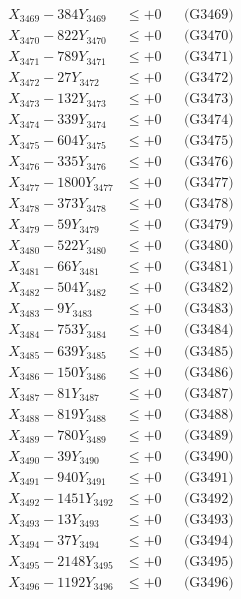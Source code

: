 \documentclass[a4paper,10pt]{article}
\begin{document}
{\begin{align}
X_{3469} - 384Y_{3469} &\leq +0 && \text{(G3469)} \\
X_{3470} - 822Y_{3470} &\leq +0 && \text{(G3470)} \\
\allowbreak
X_{3471} - 789Y_{3471} &\leq +0 && \text{(G3471)} \\
X_{3472} - 27Y_{3472} &\leq +0 && \text{(G3472)} \\
X_{3473} - 132Y_{3473} &\leq +0 && \text{(G3473)} \\
X_{3474} - 339Y_{3474} &\leq +0 && \text{(G3474)} \\
X_{3475} - 604Y_{3475} &\leq +0 && \text{(G3475)} \\
X_{3476} - 335Y_{3476} &\leq +0 && \text{(G3476)} \\
X_{3477} - 1800Y_{3477} &\leq +0 && \text{(G3477)} \\
X_{3478} - 373Y_{3478} &\leq +0 && \text{(G3478)} \\
X_{3479} - 59Y_{3479} &\leq +0 && \text{(G3479)} \\
X_{3480} - 522Y_{3480} &\leq +0 && \text{(G3480)} \\
\allowbreak
X_{3481} - 66Y_{3481} &\leq +0 && \text{(G3481)} \\
X_{3482} - 504Y_{3482} &\leq +0 && \text{(G3482)} \\
X_{3483} - 9Y_{3483} &\leq +0 && \text{(G3483)} \\
X_{3484} - 753Y_{3484} &\leq +0 && \text{(G3484)} \\
X_{3485} - 639Y_{3485} &\leq +0 && \text{(G3485)} \\
X_{3486} - 150Y_{3486} &\leq +0 && \text{(G3486)} \\
X_{3487} - 81Y_{3487} &\leq +0 && \text{(G3487)} \\
X_{3488} - 819Y_{3488} &\leq +0 && \text{(G3488)} \\
X_{3489} - 780Y_{3489} &\leq +0 && \text{(G3489)} \\
X_{3490} - 39Y_{3490} &\leq +0 && \text{(G3490)} \\
\allowbreak
X_{3491} - 940Y_{3491} &\leq +0 && \text{(G3491)} \\
X_{3492} - 1451Y_{3492} &\leq +0 && \text{(G3492)} \\
X_{3493} - 13Y_{3493} &\leq +0 && \text{(G3493)} \\
X_{3494} - 37Y_{3494} &\leq +0 && \text{(G3494)} \\
X_{3495} - 2148Y_{3495} &\leq +0 && \text{(G3495)} \\
X_{3496} - 1192Y_{3496} &\leq +0 && \text{(G3496)} \\

\end{align}}
\end{document}
